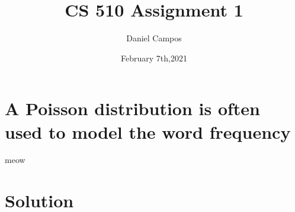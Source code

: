 \documentclass[11pt]{article}
\title{CS 510 Assignment 1}
\author{Daniel Campos}
\date{February 7th,2021}
\begin{document}
\maketitle
\section{A Poisson distribution is often used to model the word frequency }
meow
\section{Solution}
\end{document}
